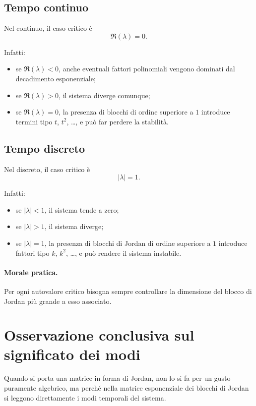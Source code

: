 \subsection{Tempo continuo}

Nel continuo, il caso critico è
\[
\Re(\lambda)=0.
\]

Infatti:
\begin{itemize}
    \item se $\Re(\lambda)<0$, anche eventuali fattori polinomiali vengono dominati dal decadimento esponenziale;
    \item se $\Re(\lambda)>0$, il sistema diverge comunque;
    \item se $\Re(\lambda)=0$, la presenza di blocchi di ordine superiore a $1$ introduce termini tipo $t$, $t^2$, \dots, e può far perdere la stabilità.
\end{itemize}

\subsection{Tempo discreto}

Nel discreto, il caso critico è
\[
|\lambda|=1.
\]

Infatti:
\begin{itemize}
    \item se $|\lambda|<1$, il sistema tende a zero;
    \item se $|\lambda|>1$, il sistema diverge;
    \item se $|\lambda|=1$, la presenza di blocchi di Jordan di ordine superiore a $1$ introduce fattori tipo $k$, $k^2$, \dots, e può rendere il sistema instabile.
\end{itemize}

\paragraph{Morale pratica.}
Per ogni autovalore critico bisogna sempre controllare la dimensione del blocco di Jordan più grande a esso associato.

\section{Osservazione conclusiva sul significato dei modi}

Quando si porta una matrice in forma di Jordan, non lo si fa per un gusto puramente algebrico, ma perché nella matrice esponenziale dei blocchi di Jordan si leggono direttamente i modi temporali del sistema.

